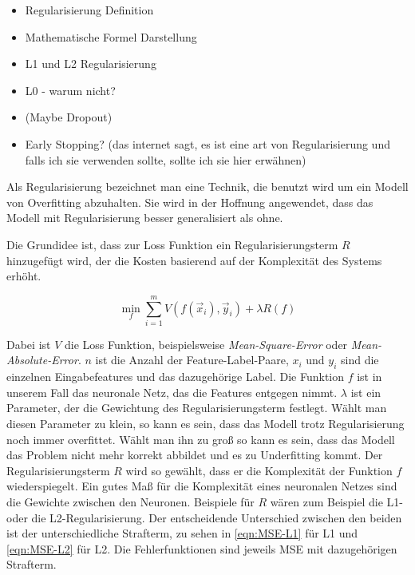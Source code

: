 \begin{itemize}
	\item Regularisierung Definition
	\item Mathematische Formel Darstellung
	\item L1 und L2 Regularisierung
	\item L0 - warum nicht?
	\item (Maybe Dropout)
	\item Early Stopping? (das internet sagt, es ist eine art von Regularisierung und falls ich sie verwenden sollte, sollte ich sie hier erwähnen)
\end{itemize}

\color{blue}
Als Regularisierung bezeichnet man eine Technik, die benutzt wird um ein Modell von Overfitting abzuhalten.
Sie wird in der Hoffnung angewendet, dass das Modell mit Regularisierung besser generalisiert als ohne.

Die Grundidee ist, dass zur Loss Funktion ein Regularisierungsterm \(R\) hinzugefügt wird, 
der die Kosten basierend auf der Komplexität des Systems erhöht.

\begin{equation}
	\min_f \sum\limits_{i=1}^{m} V(f(\vec{x}_i), \vec{y}_i) + \lambda R(f)
\end{equation} 

Dabei ist \(V\) die Loss Funktion, beispielsweise \textit{Mean-Square-Error} oder \textit{Mean-Absolute-Error}.
\(n\) ist die Anzahl der Feature-Label-Paare,
\(x_i\) und \(y_i\) sind die einzelnen Eingabefeatures und das dazugehörige Label.
Die Funktion \(f\) ist in unserem Fall das neuronale Netz, das die Features entgegen nimmt.
\(\lambda\) ist ein Parameter, der die Gewichtung des Regularisierungsterm festlegt.
Wählt man diesen Parameter zu klein, so kann es sein, dass das Modell trotz Regularisierung noch immer overfittet.
Wählt man ihn zu groß so kann es sein, dass das Modell das Problem nicht mehr korrekt abbildet und es zu Underfitting kommt.
Der Regularisierungsterm \(R\) wird so gewählt, dass er die Komplexität der Funktion \(f\) wiederspiegelt.
Ein gutes Maß für die Komplexität eines neuronalen Netzes sind die Gewichte zwischen den Neuronen.
Beispiele für \(R\) wären zum Beispiel die L1- oder die L2-Regularisierung. %
Der entscheidende Unterschied zwischen den beiden ist der unterschiedliche Strafterm, zu sehen in \ref{eqn:MSE-L1} für L1 und \ref{eqn:MSE-L2} für L2. 
Die Fehlerfunktionen sind jeweils MSE mit dazugehörigen Strafterm.

